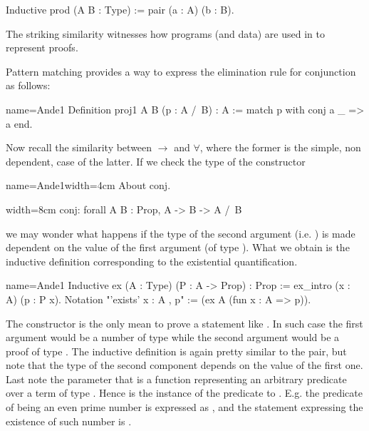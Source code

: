 \begin{coq}{}{}
Inductive prod (A B : Type) := pair (a : A) (b : B).
\end{coq}
The striking similarity witnesses how programs (and data) are used in \Coq{}
to represent proofs.

Pattern matching provides a way to express the elimination rule for
conjunction as follows:

\begin{coq}{name=Ande1}{}
Definition proj1 A B (p : A /\ B) : A :=
  match p with conj a _ => a end.
\end{coq}

Now recall the similarity between $\to$ and $\forall$, where the former is the
simple, non dependent, case of the latter.  If we check the type of
the  constructor

\begin{coq}{name=Ande1}{width=4cm}
About conj.
\end{coq}
\begin{coqout}{}{width=8cm}
conj: forall A B : Prop, A -> B -> A /\ B
\end{coqout}
we may wonder what happens if the type of the second argument (i.e. ) is
made dependent on the value of the first argument (of type ).
What we obtain is the inductive definition corresponding to the
existential quantification.

\begin{coq}{name=Ande1}{}
Inductive ex (A : Type) (P : A -> Prop) : Prop :=
  ex_intro (x : A) (p : P x).
Notation "'exists' x : A , p" := (ex A (fun x : A => p)).
\end{coq}

The  constructor is the only mean to prove a statement like
.  In such case the first argument would be a number
 of type  while the second argument would be a proof  of type
.  The  inductive definition is again pretty similar to the
pair, but note that the type of the second component depends on the value of
the first one.  Last note the parameter  that is a function
representing an arbitrary predicate over a term of
type .  Hence  is the instance of the predicate to .  E.g.
the predicate of being an even prime number is expressed as
, and the statement expressing the
existence of such number is
.

